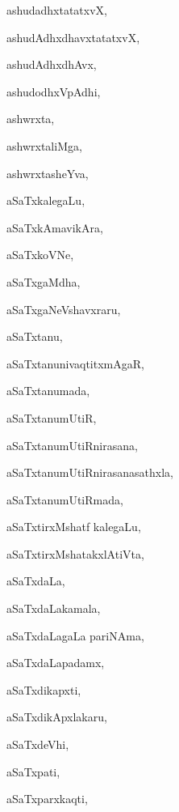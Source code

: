 \begin{multicols}{2}
{ashudadhxtatatxvX}, \pageref{ashudadhxtatatxvX}

{ashudAdhxdhavxtatatxvX}, \pageref{ashudAdhxdhavxtatatxvX}

{ashudAdhxdhAvx}, \pageref{ashudAdhxdhAvx}

{ashudodhxVpAdhi}, \pageref{ashudodhxVpAdhi}

{ashwrxta}, \pageref{ashwrxta}

{ashwrxtaliMga}, \pageref{ashwrxtaliMga}

{ashwrxtasheYva}, \pageref{ashwrxtasheYva}

{aSaTxkalegaLu}, \pageref{aSaTxkalegaLu}

{aSaTxkAmavikAra}, \pageref{aSaTxkAmavikAra}

{aSaTxkoVNe}, \pageref{aSaTxkoVNe}

{aSaTxgaMdha}, \pageref{aSaTxgaMdha}

{aSaTxgaNeVshavxraru}, \pageref{aSaTxgaNeVshavxraru}

{aSaTxtanu}, \pageref{aSaTxtanu}

{aSaTxtanunivaqtitxmAgaR}, \pageref{aSaTxtanunivaqtitxmAgaR}

{aSaTxtanumada}, \pageref{aSaTxtanumada}

{aSaTxtanumUtiR}, \pageref{aSaTxtanumUtiR}

{aSaTxtanumUtiRnirasana}, \pageref{aSaTxtanumUtiRnirasana}

{aSaTxtanumUtiRnirasanasathxla}, \pageref{aSaTxtanumUtiRnirasanasathxla}

{aSaTxtanumUtiRmada}, \pageref{aSaTxtanumUtiRmada}

{aSaTxtirxMshatf kalegaLu}, \pageref{aSaTxtirxMshatf kalegaLu}

{aSaTxtirxMshatakxlAtiVta}, \pageref{aSaTxtirxMshatakxlAtiVta}

{aSaTxdaLa}, \pageref{aSaTxdaLa}

{aSaTxdaLakamala}, \pageref{aSaTxdaLakamala}

{aSaTxdaLagaLa pariNAma}, \pageref{aSaTxdaLagaLa pariNAma}

{aSaTxdaLapadamx}, \pageref{aSaTxdaLapadamx}

{aSaTxdikapxti}, \pageref{aSaTxdikapxti}

{aSaTxdikApxlakaru}, \pageref{aSaTxdikApxlakaru}

{aSaTxdeVhi}, \pageref{aSaTxdeVhi}

{aSaTxpati}, \pageref{aSaTxpati}

{aSaTxparxkaqti}, \pageref{aSaTxparxkaqti}


\end{multicols}
